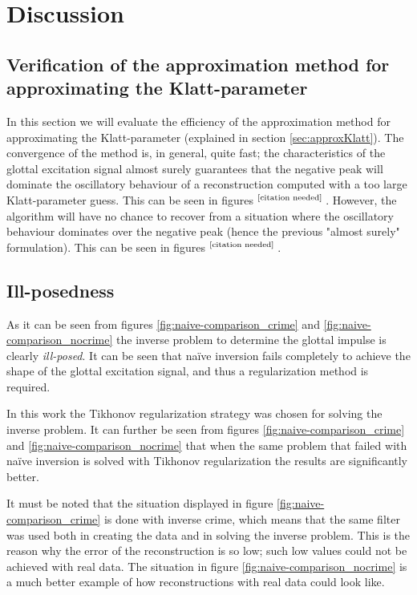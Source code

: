 \documentclass[12pt,a4]{article}
\newcommand{\citeneeded}{\ensuremath{\vphantom{1}^{\text{[citation needed]}}\,}}
\begin{document}
\section{Discussion}
\label{sec:discussion}

\subsection{Verification of the approximation method for \\approximating the Klatt-parameter}

In this section we will evaluate the efficiency of the approximation method for approximating the Klatt-parameter (explained in section \ref{sec:approxKlatt}). The convergence of the method is, in general, quite fast; the characteristics of the glottal excitation signal almost surely guarantees that the negative peak will dominate the oscillatory behaviour of a reconstruction computed with a too large Klatt-parameter guess.
This can be seen in figures \citeneeded. However, the algorithm will have no chance to recover from a situation where the oscillatory behaviour dominates over the negative peak (hence the previous "almost surely" formulation). This can be seen in figures \citeneeded. 

\subsection{Ill-posedness}

As it can be seen from figures \ref{fig:naive-comparison_crime} and \ref{fig:naive-comparison_nocrime} the inverse problem to determine the glottal impulse is clearly \emph{ill-posed}. It can be seen that naïve inversion fails completely to achieve the shape of the glottal excitation signal, and thus a regularization method is required.

In this work the Tikhonov regularization strategy was chosen for solving the inverse problem. It can further be seen from figures \ref{fig:naive-comparison_crime} and \ref{fig:naive-comparison_nocrime} that when the same problem that failed with naïve inversion is solved with Tikhonov regularization the results are significantly better.

It must be noted that the situation displayed in figure \ref{fig:naive-comparison_crime} is done with inverse crime, which means that the same filter was used both in creating the data and in solving the inverse problem. This is the reason why the error of the reconstruction is so low; such low values could not be achieved with real data. The situation in figure \ref{fig:naive-comparison_nocrime} is a much better example of how reconstructions with real data could look like.
\end{document}
